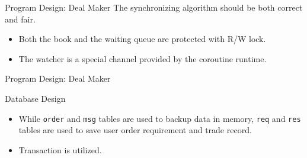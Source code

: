 \documentclass{beamer}
\begin{document}
\begin{frame}{Program Design: Deal Maker}
	The synchronizing algorithm should be both correct and fair.
	\begin{itemize}
		\item Both the book and the waiting queue are protected with R/W lock.
		\item The watcher is a special channel provided by the coroutine runtime.
	\end{itemize}
\end{frame}
\begin{frame}{Program Design: Deal Maker}
	\scalebox{0.4}{}
\end{frame}
\begin{frame}{Database Design}
	\scalebox{0.35}{}
	\begin{itemize}
		\item While \lstinline|order| and \lstinline|msg| tables are used to backup data in memory, \lstinline|req| and \lstinline|res| tables are used to save user order requirement and trade record.
		\item Transaction is utilized.
	\end{itemize}
\end{frame}
\end{document}

